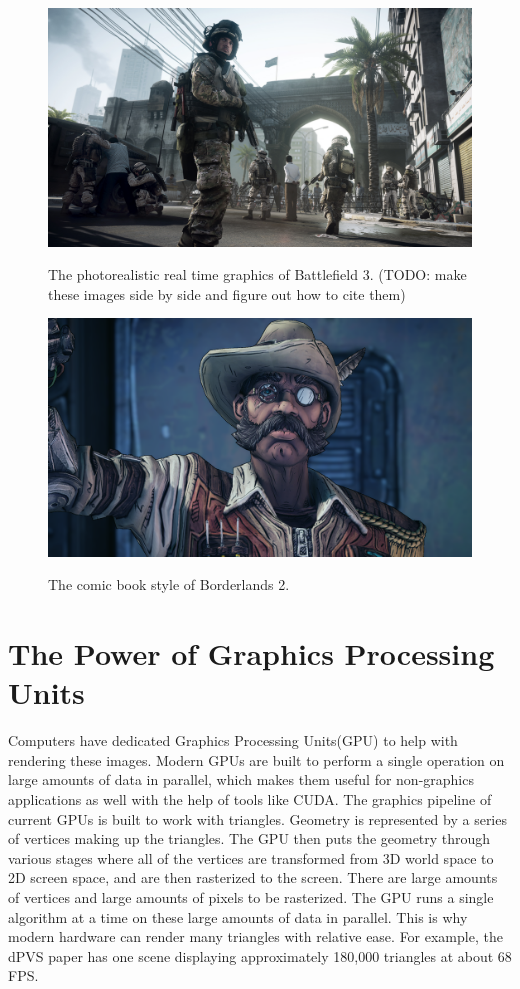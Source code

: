 \documentclass[12pt]{ucthesis}
\newcommand{\captionfonts}{\small\bf\ssp}
\begin{document}
\begin{figure}
\begin{center}
\includegraphics[width=\textwidth]{Images/BF3.jpg}
\captionfonts
\caption[Battlefield 3]{The photorealistic real time graphics of Battlefield 3. (TODO: make these images side by side and figure out how to cite them)}
\label{fig:bf3}
\includegraphics[width=\textwidth]{Images/Borderlands_2.png}
\captionfonts
\caption[Borderlands 2]{The comic book style of Borderlands 2.}
\label{fig:borderlands2}
\end{center}
\end{figure}

\section{The Power of Graphics Processing Units}
\label{gpu}
Computers have dedicated Graphics Processing Units(GPU) to help with rendering these images.
Modern GPUs are built to perform a single operation on large amounts of data in parallel, which makes them useful for non-graphics applications as well with the help of tools like CUDA.\cite{FermiArch}
The graphics pipeline of current GPUs is built to work with triangles.\cite{d3d11-pipeline}
Geometry is represented by a series of vertices making up the triangles.
The GPU then puts the geometry through various stages where all of the vertices are transformed from 3D world space to 2D screen space, and are then rasterized to the screen.
There are large amounts of vertices and large amounts of pixels to be rasterized.
The GPU runs a single algorithm at a time on these large amounts of data in parallel.
This is why modern hardware can render many triangles with relative ease.
For example, the dPVS paper has one scene displaying approximately 180,000 triangles at about 68 FPS.\cite{dpvs}
\end{document}
